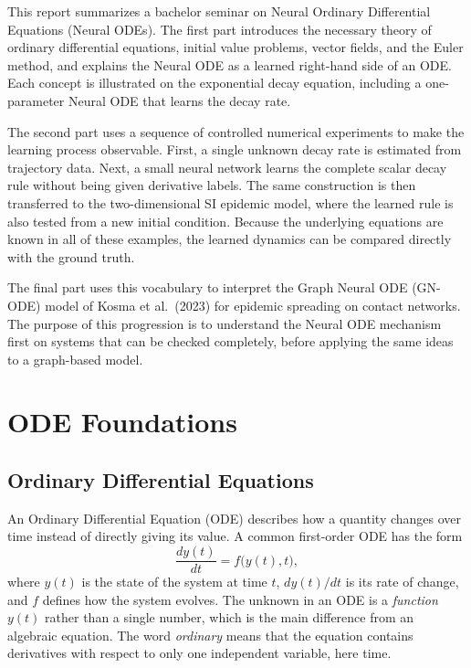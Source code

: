 \documentclass[11pt,a4paper]{article}
\begin{document}
This report summarizes a bachelor seminar on Neural Ordinary Differential
Equations (Neural ODEs). The first part introduces the necessary theory of
ordinary differential equations, initial value problems, vector fields, and the
Euler method, and explains the Neural ODE as a learned right-hand side of an
ODE. Each concept is illustrated on the exponential decay equation, including a
one-parameter Neural ODE that learns the decay rate.

The second part uses a sequence of controlled numerical experiments to make
the learning process observable. First, a single unknown decay rate is
estimated from trajectory data. Next, a small neural network learns the
complete scalar decay rule without being given derivative labels. The same
construction is then transferred to the two-dimensional SI epidemic model,
where the learned rule is also tested from a new initial condition. Because
the underlying equations are known in all of these examples, the learned
dynamics can be compared directly with the ground truth.

The final part uses this vocabulary to interpret the Graph Neural ODE
(GN-ODE) model of Kosma et al.\ (2023) for epidemic spreading on contact
networks. The purpose of this progression is to understand the Neural ODE
mechanism first on systems that can be checked completely, before applying
the same ideas to a graph-based model.


\section{ODE Foundations}

\subsection{Ordinary Differential Equations}

An Ordinary Differential Equation (ODE) describes how a quantity changes over
time instead of directly giving its value. A common first-order ODE has the form
\begin{equation}
  \frac{dy(t)}{dt} = f\bigl(y(t),t\bigr),
  \label{eq:ode}
\end{equation}
where $y(t)$ is the state of the system at time $t$, $dy(t)/dt$ is its rate of
change, and $f$ defines how the system evolves. The unknown in an ODE is a
\emph{function} $y(t)$ rather than a single number, which is the main difference
from an algebraic equation. The word \emph{ordinary} means that the equation
contains derivatives with respect to only one independent variable, here time.
\end{document}

